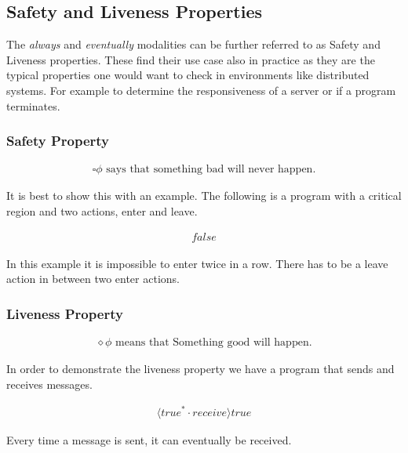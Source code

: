\documentclass{clseminar}
\begin{document}
  \subsection{Safety and Liveness Properties}

  The \textit{always} and \textit{eventually} modalities can be further referred to as Safety and Liveness properties. These find their use case also in practice as they are the typical properties one would want to check in environments like distributed systems. For example to determine the responsiveness of a server or if a program terminates.

  \subsubsection{Safety Property}

  \begin{align*}
    \square\phi \text{ says that something bad will never happen.}
  \end{align*}

  It is best to show this with an example. The following is a program with a critical region and two actions, enter and leave.

  \begin{align*}
    [\mathit{true}^*\cdot \mathit{enter} \cdot \overline{\mathit{leave}}^* \cdot \mathit{enter}]\mathit{false}
  \end{align*}

  In this example it is impossible to enter twice in a row. There has to be a leave action in
  between two enter actions.

  \pagebreak
  \subsubsection{Liveness Property}

  \begin{align*}
    \diamond\phi \text{ means that Something good will happen.}
  \end{align*}

  In order to demonstrate the liveness property we have a program that sends and receives messages.

  \begin{align*}
    [\mathit{true}^*\cdot \mathit{send}]\langle \mathit{true}^* \cdot \mathit{receive} \rangle \mathit{true}
  \end{align*}

  Every time a message is sent, it can eventually be received.
\end{document}
